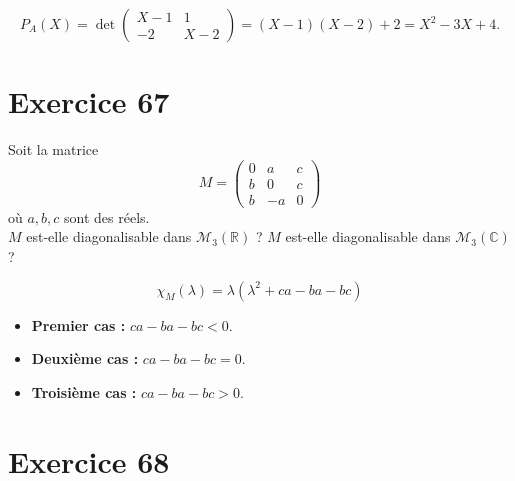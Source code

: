 \documentclass[a4paper,12pt,oneside]{book}
\newenvironment{statement}{\begin{statementbox}}{\end{statementbox}}
\newenvironment{solution}{\begin{solutionbox}}{\end{solutionbox}}
\begin{document}
\begin{solution}
		\[
		P_A(X) = \det \begin{pmatrix} X - 1 & 1 \\ -2 & X - 2 \end{pmatrix}
		= (X - 1)(X - 2) + 2 = X^2 - 3X + 4.
		\]
\end{solution}

\section*{Exercice 67}

\begin{statement}
	Soit la matrice
	\[
	M = \begin{pmatrix}
		0 & a & c \\
		b & 0 & c \\
		b & -a & 0
	\end{pmatrix}
	\]
	où $a,b,c$ sont des réels.\\
	$M$ est-elle diagonalisable dans $\mathcal M_3(\mathbb R)$ ? $M$ est-elle diagonalisable dans $\mathcal M_3(\mathbb C)$ ?
\end{statement}

\begin{solution}
	\[
	\chi_M(\lambda) = \lambda \left( \lambda^2 + ca - ba - bc \right)
	\]
	
	\begin{itemize}
		\item \textbf{Premier cas :} $ca - ba - bc < 0$.
		\item \textbf{Deuxième cas :} $ca - ba - bc = 0$.
		\item \textbf{Troisième cas :} $ca - ba - bc > 0$.
	\end{itemize}
\end{solution}

\section*{Exercice 68}
\end{document}
